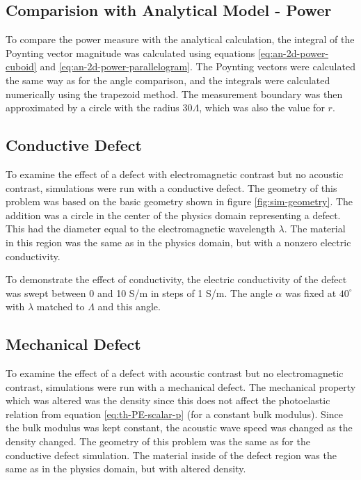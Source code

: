 \documentclass[11pt,twoside]{eitExjobb}
\begin{document}
	\subsection{Comparision with Analytical Model - Power}
	To compare the power measure with the analytical calculation, the integral of the Poynting vector magnitude was calculated using equations \eqref{eq:an-2d-power-cuboid} and \eqref{eq:an-2d-power-parallelogram}. The Poynting vectors were calculated the same way as for the angle comparison, and the integrals were calculated numerically using the trapezoid method. The measurement boundary was then approximated by a circle with the radius $30\Lambda$, which was also the value for $r$.
	
	\subsection{Conductive Defect}
	To examine the effect of a defect with electromagnetic contrast but no acoustic contrast, simulations were run with a conductive defect. The geometry of this problem was based on the basic geometry shown in figure \ref{fig:sim-geometry}. The addition was a circle in the center of the physics domain representing a defect. This had the diameter equal to the electromagnetic wavelength $\lambda$. The material in this region was the same as in the physics domain, but with a nonzero electric conductivity.
	
	To demonstrate the effect of conductivity, the electric conductivity of the defect was swept between 0 and 10 S/m in steps of 1 S/m. The angle $\alpha$ was fixed at $40^\circ$ with $\lambda$ matched to $\Lambda$ and this angle.
	
	\subsection{Mechanical Defect}
	To examine the effect of a defect with acoustic contrast but no electromagnetic contrast, simulations were run with a mechanical defect. The mechanical property which was altered was the density since this does not affect the photoelastic relation from equation \eqref{eq:th-PE-scalar-p} (for a constant bulk modulus). Since the bulk modulus was kept constant, the acoustic wave speed was changed as the density changed. The geometry of this problem was the same as for the conductive defect simulation. The material inside of the defect region was the same as in the physics domain, but with altered density.
	
\end{document}
